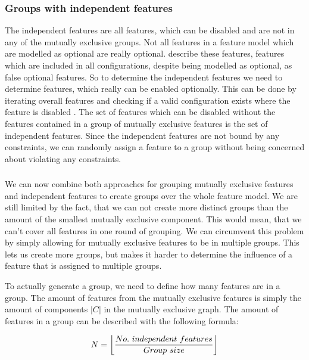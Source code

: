 \documentclass[../../thesis.tex]{subfiles}
\begin{document}
\subsubsection{Groups with independent features}
The independent features are all features, which can be disabled and are not in any of the mutually exclusive groups.
Not all features in a feature model which are modelled as optional are really optional.
 describe these features, features which are included in all configurations, despite being modelled
as optional, as false optional features.
So to determine the independent features we need to determine features, which really can be enabled optionally.
This can be done by iterating overall features and checking if a valid configuration exists where the feature is disabled
\cite{schroter2013automated}. 
The set of features which can be disabled without the features contained in a group of mutually exclusive features is
the set of independent features. Since the independent features are not bound by any constraints, we can randomly
assign a feature to a group without being concerned about violating any constraints.

\subsubsection{}
We can now combine both approaches for grouping mutually exclusive features and independent features
to create groups over the whole feature model. We are still limited by the fact, that we can not create
more distinct groups than the amount of the smallest mutually exclusive component. This would mean, that
we can't cover all features in one round of grouping. We can circumvent this problem by simply allowing for
mutually exclusive features to be in multiple groups. This lets us create more groups, but makes it harder
to determine the influence of a feature that is assigned to multiple groups.

To actually generate a group, we need to define how many features are in a group.
The amount of features from the mutually exclusive features is simply the amount
of components $|C|$ in the mutually exclusive graph.
The amount of features in a group can be described with the following formula:

\begin{equation} \label{eq:group_sampling:creation_of_groups:hamming:mutex}
    N=\myfloor{\frac{No.\ independent\ features}{Group\ size}}
\end{equation}
\end{document}
